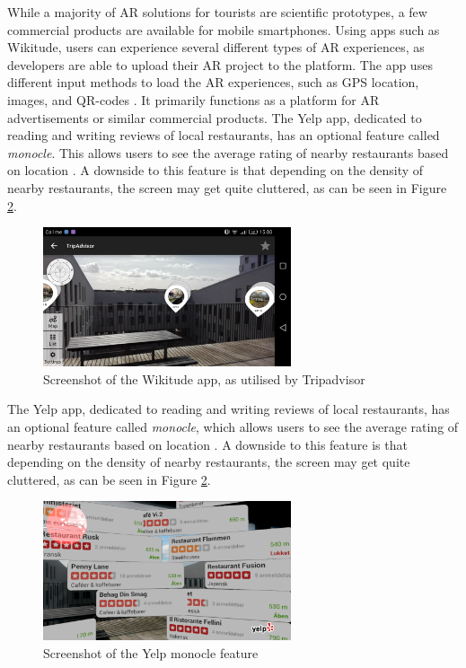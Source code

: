 While a majority of AR solutions for tourists are scientific prototypes, a few commercial products are available for mobile smartphones. Using apps such as Wikitude, users can experience several different types of AR experiences, as developers are able to upload their AR project to the platform. The app uses different input methods to load the AR experiences, such as GPS location, images, and QR-codes \cite{Wikitude}. It primarily functions as a platform for AR advertisements or similar commercial products. The Yelp app, dedicated to reading and writing reviews of local restaurants, has an optional feature called \textit{monocle}. This allows users to see the average rating of nearby restaurants based on location \cite{Yelp}. A downside to this feature is that depending on the density of nearby restaurants, the screen may get quite cluttered, as can be seen in Figure \ref{fig:yelp}.

\begin{figure}[h!]
    \centering
    \includegraphics[width=0.65\textwidth]{figures/wikitude.png}
    \caption{Screenshot of the Wikitude app, as utilised by Tripadvisor}\label{fig:wikitude}
\end{figure}

The Yelp app, dedicated to reading and writing reviews of local restaurants, has an optional feature called \textit{monocle}, which allows users to see the average rating of nearby restaurants based on location \cite{Yelp}. A downside to this feature is that depending on the density of nearby restaurants, the screen may get quite cluttered, as can be seen in Figure \ref{fig:yelp}.

\begin{figure}[h!]
    \centering
    \includegraphics[width=0.65\textwidth]{figures/yelp.png}
    \caption{Screenshot of the Yelp monocle feature}\label{fig:yelp}
\end{figure}\pagebreak


